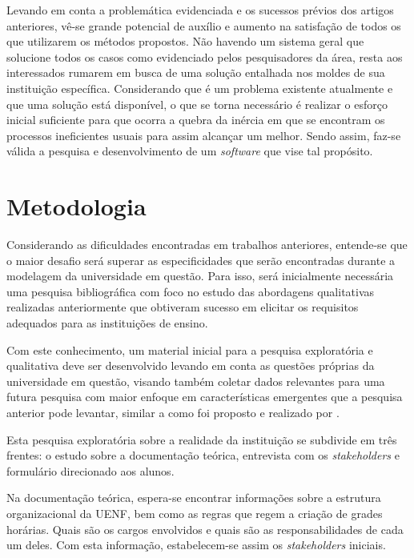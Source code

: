Levando em conta a problemática evidenciada e os sucessos prévios dos artigos anteriores, vê-se grande potencial de auxílio e aumento na satisfação de todos os que utilizarem os métodos propostos. Não havendo um sistema geral que solucione todos os casos como evidenciado pelos pesquisadores da área, resta aos interessados rumarem em busca de uma solução entalhada nos moldes de sua instituição específica. Considerando que é um problema existente atualmente e que uma solução está disponível, o que se torna necessário é realizar o esforço inicial suficiente para que ocorra a quebra da inércia em que se encontram os processos ineficientes usuais para assim alcançar um melhor. Sendo assim, faz-se válida a pesquisa e desenvolvimento de um \textit{software} que vise tal propósito.

\section{Metodologia} \label{sec:Metodologia}            %

Considerando as dificuldades encontradas em trabalhos anteriores, entende-se que o maior desafio será superar as especificidades que serão encontradas durante a modelagem da universidade em questão. Para isso, será inicialmente necessária uma pesquisa bibliográfica com foco no estudo das abordagens qualitativas realizadas anteriormente que obtiveram sucesso em elicitar os requisitos adequados para as instituições de ensino.

Com este conhecimento, um material inicial para a pesquisa exploratória e qualitativa deve ser desenvolvido levando em conta as questões próprias da universidade em questão, visando também coletar dados relevantes para uma futura pesquisa com maior enfoque em características emergentes que a pesquisa anterior pode levantar, similar a como foi proposto e realizado por .

Esta pesquisa exploratória sobre a realidade da instituição se subdivide em três frentes: o estudo sobre a documentação teórica, entrevista com os \textit{stakeholders} e formulário direcionado aos alunos.

Na documentação teórica, espera-se encontrar informações sobre a estrutura organizacional da UENF, bem como as regras que regem a criação de grades horárias. Quais são os cargos envolvidos e quais são as responsabilidades de cada um deles. Com esta informação, estabelecem-se assim os \textit{stakeholders} iniciais.

